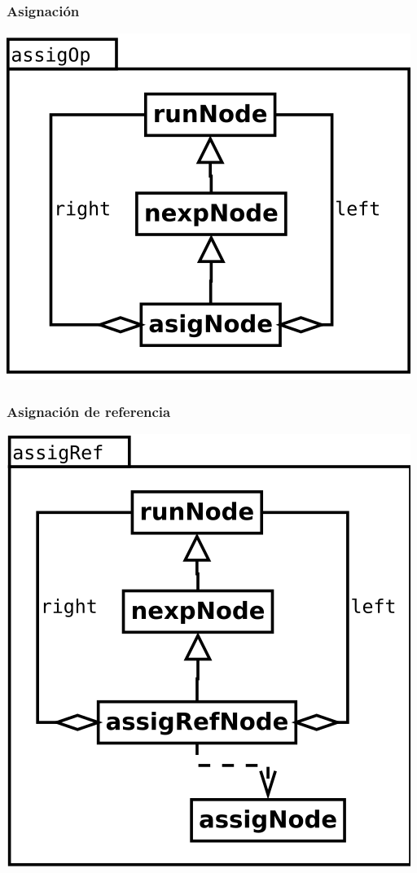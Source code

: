 \subsubsection {Asignación}
\begin{center}
\includegraphics[scale=0.4]{assigNode.png} \\
\end{center}

\subsubsection {Asignación de referencia}
\begin{center}
\includegraphics[scale=0.4]{assigRef.png} \\
\end{center}

